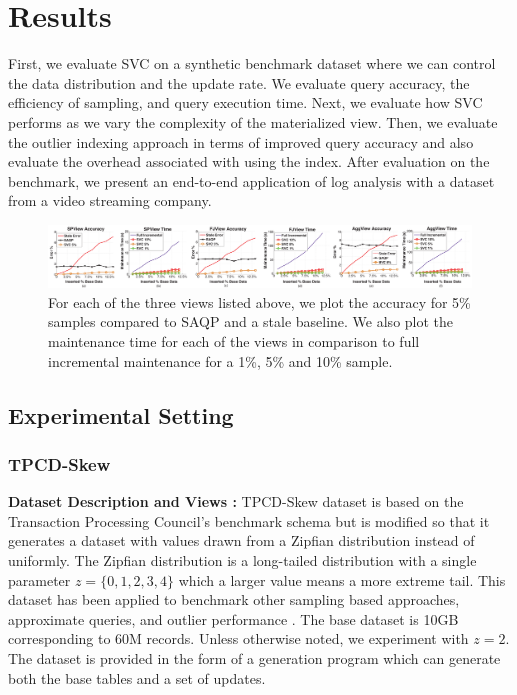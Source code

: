 \section{Results}
\label{exp}
First, we evaluate SVC on a synthetic benchmark dataset where we can control the data distribution and the update rate.
We evaluate query accuracy, the efficiency of sampling, and query execution time.
Next, we evaluate how SVC performs as we vary the complexity of the materialized view.
Then, we evaluate the outlier indexing approach in terms of improved query accuracy and also evaluate the overhead associated with using the index.
After evaluation on the benchmark, we present an end-to-end application of log analysis with a dataset from a video streaming company.

\begin{figure}[ht!]
\hspace{-5.5em}
 \includegraphics[trim = 10mm 0mm 10mm 0mm, clip, scale=0.19]{exp/exp2-full.eps}
 \caption{For each of the three views listed above, we plot the accuracy for 5\% samples compared to SAQP and a stale baseline. We also plot the maintenance time for each of the views in comparison to full incremental maintenance for a 1\%, 5\% and 10\% sample. \label{exp2update} }
\end{figure}

\subsection{Experimental Setting}
\subsubsection{TPCD-Skew}
{\noindent \bf Dataset Description and Views :}
TPCD-Skew dataset \cite{tpcdskew} is based on the Transaction Processing Council's benchmark
schema but is modified so that it generates a dataset with values drawn from a Zipfian distribution instead of uniformly.
The Zipfian distribution \cite{mitzenmacher2004brief} is a long-tailed distribution with a single parameter $z=\{0,1,2,3,4\}$ which a larger
value means a more extreme tail.
This dataset has been applied to benchmark other sampling based approaches, approximate queries, and outlier performance \cite{chaudhuri2001overcoming, agrawal2005database}.
The base dataset is 10GB corresponding to 60M records.
Unless otherwise noted, we experiment with $z=2$.
The dataset is provided in the form of a generation program which can generate both the base tables and a set of updates.

